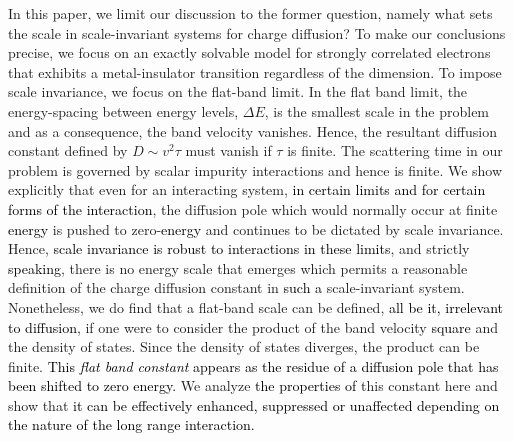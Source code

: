 \documentclass[prl,aps,twocolumn,groupaddress]{revtex4-1}
\begin{document}
In this paper, we limit our discussion to the former question, namely what sets the scale in scale-invariant systems for charge diffusion?  To make our conclusions precise, we focus on an exactly solvable model for strongly correlated electrons that exhibits a metal-insulator transition regardless of the dimension.  To impose scale invariance, we focus on the flat-band limit.  In the flat band limit, the energy-spacing between energy levels, $\Delta E$, is the smallest scale in the problem and as a consequence, the band velocity vanishes.
 Hence, the  resultant diffusion constant defined by $D\sim v^2\tau$ must vanish if $\tau$ is finite. The scattering time in our problem is governed by scalar impurity interactions and hence is finite. We show explicitly that even for an interacting system, \textcolor{black}{in certain limits and for certain forms of the interaction}, the diffusion pole which would normally occur at finite \textcolor{black}{energy} is pushed to zero-\textcolor{black}{energy} and continues to be dictated by scale invariance.  Hence, \textcolor{black}{scale invariance is robust to interactions in these limits}, and strictly \textcolor{black}{speaking}, there is no energy scale that emerges which permits a reasonable definition of the charge diffusion constant in \textcolor{black}{such a} scale-invariant system.  Nonetheless, we do find that a flat-band scale can be defined, \textcolor{black}{all be it, irrelevant to diffusion}, if one were to consider the product of the band velocity \textcolor{black}{square} and the density of states. Since the density of states diverges, the product can be finite. \textcolor{black}{This \textit{flat band constant} appears as the residue of a diffusion pole that has been shifted to zero energy.} We analyze \textcolor{black}{the properties of} this constant here and show that \textcolor{black}{it can be effectively enhanced, suppressed or unaffected depending on the nature of the long range interaction.}
\end{document}
